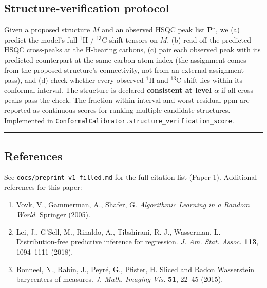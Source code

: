 \documentclass[11pt,a4paper]{article}
\providecommand{\tightlist}{\setlength{\itemsep}{0pt}\setlength{\parskip}{0pt}}
\begin{document}
\subsection{Structure-verification protocol}\label{structure-verification-protocol}

Given a proposed structure \(M\) and an observed HSQC peak list \(\mathbf{P}^\star\), we (a) predict the model's full \(^{1}\)H / \(^{13}\)C shift tensors on \(M\), (b) read off the predicted HSQC cross-peaks at the H-bearing carbons, (c) pair each observed peak with its predicted counterpart at the same carbon-atom index (the assignment comes from the proposed structure's connectivity, not from an external assignment pass), and (d) check whether every observed \(^{1}\)H and \(^{13}\)C shift lies within its conformal interval. The structure is declared \textbf{consistent at level \(\alpha\)} if all cross-peaks pass the check. The fraction-within-interval and worst-residual-ppm are reported as continuous scores for ranking multiple candidate structures. Implemented in \texttt{ConformalCalibrator.structure\_verification\_score}.

\begin{center}\rule{0.5\linewidth}{0.5pt}\end{center}

\subsection{References}\label{references}

See \texttt{docs/preprint\_v1\_filled.md} for the full citation list (Paper 1). Additional references for this paper:

\begin{enumerate}
\def\labelenumi{\arabic{enumi}.}
\tightlist
\item
  Vovk, V., Gammerman, A., Shafer, G. \emph{Algorithmic Learning in a Random World}. Springer (2005).
\item
  Lei, J., G'Sell, M., Rinaldo, A., Tibshirani, R. J., Wasserman, L. Distribution-free predictive inference for regression. \emph{J. Am. Stat. Assoc.} \textbf{113}, 1094--1111 (2018).
\item
  Bonneel, N., Rabin, J., Peyré, G., Pfister, H. Sliced and Radon Wasserstein barycenters of measures. \emph{J. Math. Imaging Vis.} \textbf{51}, 22--45 (2015).
\end{enumerate}
\end{document}

